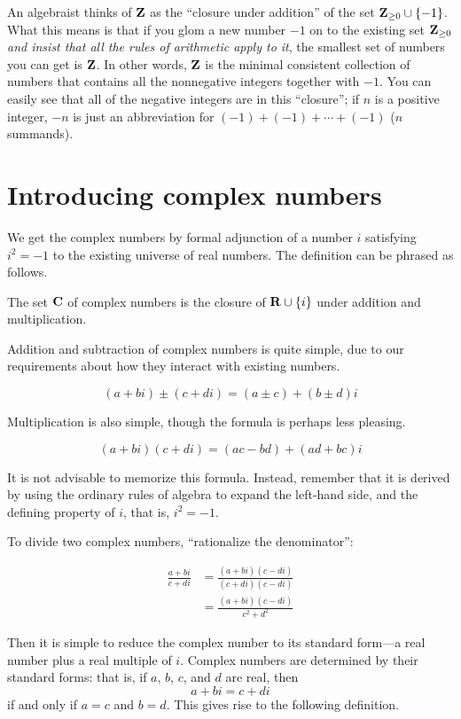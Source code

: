 \documentclass[twocolumn,12pt]{article}
\begin{document}
An algebraist thinks of $\mathbf{Z}$ as the ``closure under addition'' of the set $\mathbf{Z}_{\geq 0} \cup \{-1\}$. What this means is that if you glom a new number $-1$ on to the existing set $\mathbf{Z}_{\geq 0}$ \emph{and insist that all the rules of arithmetic apply to it}, the smallest set of numbers you can get is $\mathbf{Z}$. In other words, $\mathbf{Z}$ is the minimal consistent collection of numbers that contains all the nonnegative integers together with $-1$. You can easily see that all of the negative integers are in this ``closure''; if $n$ is a positive integer, $-n$ is just an abbreviation for $(-1) + (-1) + \cdots + (-1)$ ($n$ summands).

\section{Introducing complex numbers}
We get the complex numbers by formal adjunction of a number $i$ satisfying $i^2 = -1$ to the existing universe of real numbers. The definition can be phrased as follows.
\begin{definition}
The set $\mathbf{C}$ of complex numbers is the closure of $\mathbf{R} \cup \{ i \}$ under addition and multiplication. 
\end{definition}
Addition and subtraction of complex numbers is quite simple, due to our requirements about how they interact with existing numbers.
\begin{gridenv}
  \begin{equation*}
    (a + bi) \pm (c + di) = (a \pm c) + (b \pm d)i
  \end{equation*}
\end{gridenv}
Multiplication is also simple, though the formula is perhaps less pleasing.
\begin{gridenv}
  \begin{equation*}
    (a + bi)(c + di) = (ac - bd) + (ad + bc)i
  \end{equation*}
\end{gridenv}
It is not advisable to memorize this formula. Instead, remember that it is derived by using the ordinary rules of algebra to expand the left-hand side, and the defining property of $i$, that is, $i^2 = -1$.

To divide two complex numbers, ``rationalize the denominator'':
\begin{gridenv}
  \begin{align*}
    \frac{a+bi}{c+di} &= \frac{(a+bi)(c-di)}{(c+di)(c-di)} \\
                      &= \frac{(a+bi)(c-di)}{c^2+d^2}
  \end{align*}
\end{gridenv}
Then it is simple to reduce the complex number to its standard form---a real number plus a real multiple of $i$. Complex numbers are determined by their standard forms: that is, if $a$, $b$, $c$, and $d$ are real, then 
$$a + bi = c + di$$
if and only if $a = c$ and $b = d$. This gives rise to the following definition.
\end{document}

